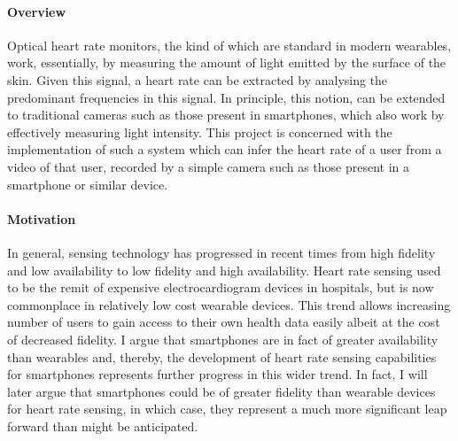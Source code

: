 \paragraph{Overview}
Optical heart rate monitors, the kind of which are standard in modern wearables,
work, essentially, by measuring the amount of light emitted by the surface of the skin.
Given this signal, a heart rate can be extracted by analysing the predominant frequencies in this signal. In principle, 
this notion, can be extended to traditional cameras such as those present in smartphones, which also work by effectively measuring light intensity.
This project is concerned with the implementation of such a system which can infer the heart rate of a user from a video of that user, recorded by a simple camera such as those
present in a smartphone or similar device.

\paragraph{Motivation}
In general, sensing technology has progressed in recent times from high fidelity and low availability to low fidelity and high availability.
Heart rate sensing used to be the remit of expensive electrocardiogram devices in hospitals, but is now commonplace in relatively low cost wearable devices.
This trend allows increasing number of users to gain access to their own health data easily albeit at the cost of decreased fidelity.
I argue that smartphones are in fact of greater availability than wearables and, thereby, the development of heart rate sensing capabilities for 
smartphones represents further progress in this wider trend. 
In fact, I will later argue that smartphones could be of greater fidelity than wearable devices for heart rate sensing, in which case, they represent a much more significant 
leap forward than might be anticipated.

